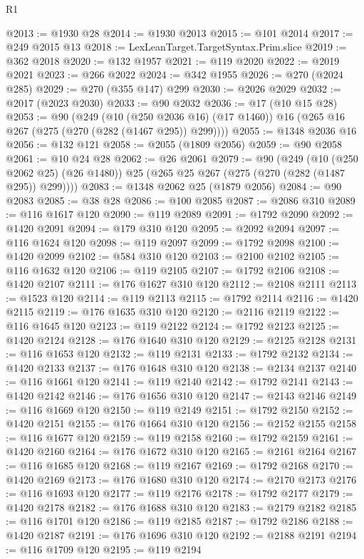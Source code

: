 \begin{lexlean}{R1}
\begin{coremodule}
@2013 := @1930 @28
@2014 := @1930 @2013
@2015 := @101 @2014
@2017 := @249 @2015 @13
@2018 := LexLeanTarget.TargetSyntax.Prim.slice
@2019 := @362 @2018
@2020 := @132 @1957
@2021 := @119 @2020
@2022 := @2019 @2021
@2023 := @266 @2022
@2024 := @342 @1955
@2026 := @270 (@2024 @285)
@2029 := @270 (@355 @147) @299
@2030 := @2026 @2029
@2032 := @2017 (@2023 @2030)
@2033 := @90 @2032
@2036 := @17 (@10 @15 @28)
@2053 := @90
    (@249
      (@10 (@250 @2036 @16) (@17 @1460))
      @16
      (@265 @16 @267 (@275 (@270 (@282 (@1467 @295)) @299))))
@2055 := @1348 @2036 @16
@2056 := @132 @121
@2058 := @2055 (@1809 @2056)
@2059 := @90 @2058
@2061 := @10 @24 @28
@2062 := @26 @2061
@2079 := @90
    (@249
      (@10 (@250 @2062 @25) (@26 @1480))
      @25
      (@265 @25 @267 (@275 (@270 (@282 (@1487 @295)) @299))))
@2083 := @1348 @2062 @25 (@1879 @2056)
@2084 := @90 @2083
@2085 := @38 @28
@2086 := @100 @2085
@2087 := @2086 @310
@2089 := @116 @1617 @120
@2090 := @119 @2089
@2091 := @1792 @2090
@2092 := @1420 @2091
@2094 := @179 @310 @120
@2095 := @2092 @2094
@2097 := @116 @1624 @120
@2098 := @119 @2097
@2099 := @1792 @2098
@2100 := @1420 @2099
@2102 := @584 @310 @120
@2103 := @2100 @2102
@2105 := @116 @1632 @120
@2106 := @119 @2105
@2107 := @1792 @2106
@2108 := @1420 @2107
@2111 := @176 @1627 @310 @120
@2112 := @2108 @2111
@2113 := @1523 @120
@2114 := @119 @2113
@2115 := @1792 @2114
@2116 := @1420 @2115
@2119 := @176 @1635 @310 @120
@2120 := @2116 @2119
@2122 := @116 @1645 @120
@2123 := @119 @2122
@2124 := @1792 @2123
@2125 := @1420 @2124
@2128 := @176 @1640 @310 @120
@2129 := @2125 @2128
@2131 := @116 @1653 @120
@2132 := @119 @2131
@2133 := @1792 @2132
@2134 := @1420 @2133
@2137 := @176 @1648 @310 @120
@2138 := @2134 @2137
@2140 := @116 @1661 @120
@2141 := @119 @2140
@2142 := @1792 @2141
@2143 := @1420 @2142
@2146 := @176 @1656 @310 @120
@2147 := @2143 @2146
@2149 := @116 @1669 @120
@2150 := @119 @2149
@2151 := @1792 @2150
@2152 := @1420 @2151
@2155 := @176 @1664 @310 @120
@2156 := @2152 @2155
@2158 := @116 @1677 @120
@2159 := @119 @2158
@2160 := @1792 @2159
@2161 := @1420 @2160
@2164 := @176 @1672 @310 @120
@2165 := @2161 @2164
@2167 := @116 @1685 @120
@2168 := @119 @2167
@2169 := @1792 @2168
@2170 := @1420 @2169
@2173 := @176 @1680 @310 @120
@2174 := @2170 @2173
@2176 := @116 @1693 @120
@2177 := @119 @2176
@2178 := @1792 @2177
@2179 := @1420 @2178
@2182 := @176 @1688 @310 @120
@2183 := @2179 @2182
@2185 := @116 @1701 @120
@2186 := @119 @2185
@2187 := @1792 @2186
@2188 := @1420 @2187
@2191 := @176 @1696 @310 @120
@2192 := @2188 @2191
@2194 := @116 @1709 @120
@2195 := @119 @2194

\end{coremodule}
\end{lexlean}
